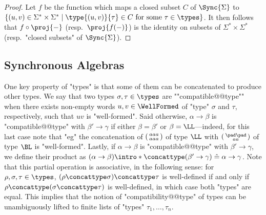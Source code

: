 \begin{proof}
	Let $f$ be the function which maps a closed subset $C$ of $\Sync{\Sigma}$ to
	$\{(u,v) \in \Sigma^* \times \Sigma^* \mid \type{(u,v)}{\tau} \in C \text{ for some $\tau \in \types$} \}$. It then follows that $f\circ \proj{-}$ (resp.~$\proj{f(-)}$) is the identity
	on subsets of $\Sigma^* \times \Sigma^*$ (resp.~"closed subsets" of $\Sync{\Sigma}$).
\end{proof}

\subsection{Synchronous Algebras}

One key property of "types" is that some of them can be concatenated to produce other types.
We say that two types $\sigma, \tau \in \types$ are \AP""compatible@@type""
when there exists non-empty words $u,v \in \WellFormed$ of "type" $\sigma$
and $\tau$, respectively, such that $uv$ is "well-formed".
Said otherwise, $\alpha \to \beta$ is "compatible@@type" with $\beta' \to \gamma$
if either $\beta = \beta'$ or $\beta = \LL$---indeed, for this last case
note that "eg" the concatenation of $\pair{aaa}{aaa}$ of type $\LL$ with
$\pair{\pad\pad}{aa}$ of type $\BL$ is "well-formed".
Lastly, if $\alpha\to \beta$ is "compatible@@type" with $\beta'\to\gamma$,
we define their product as \AP $(\alpha\to\beta)\intro*\concattype(\beta'\to\gamma) \defeq \alpha \to \gamma$.
Note that this partial operation is associative, in the following sense: for $\rho,\sigma,\tau \in \types$, $(\rho\concattype\sigma) \concattype \tau$ is well-defined if and only if
$\rho\concattype(\sigma\concattype \tau)$ is well-defined, in which case both "types" are equal.
This implies that the notion of "compatibility@@type" of types can be unambiguously
lifted to finite lists of "types" $\tau_1,\dotsc,\tau_n$.

